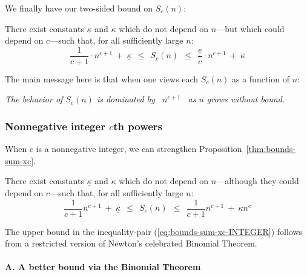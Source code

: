 \smallskip

We finally have our two-sided bound on $S_c(n)$:

\begin{prop}
\label{thm:bounds-sum-xc}
There exist constants $\underline{\kappa}$ and $\kappa$ which do not depend on $n$---but which could depend on $c$---such that, for all sufficiently large $n$:
\begin{equation}
\label{eq:bounds-sum-xc}
\frac{1}{c+1} \cdot n^{c+1} \ + \ \underline{\kappa}
  \ \ \leq \ \ S_c(n)
  \ \ \leq \ \ \frac{e}{c} \cdot n^{c+1} \ + \ \kappa
\end{equation}
\end{prop}

\medskip

\noindent
The main message here is that when one views each $S_c(n)$ as a function of $n$:

\smallskip

\begin{center}
{\em The behavior of $S_c(n)$ is dominated by \ $n^{c+1}$ \ as $n$ grows without bound.}
\end{center}

\subsubsection{Nonnegative integer $c$th powers}
\label{sec:positive-integer-power}

When $c$ is a nonnegative integer, we can strengthen Proposition~\ref{thm:bounds-sum-xc}.

\begin{prop}
\label{thm:bounds-sum-xc-INTEGER}
There exist constants $\underline{\kappa}$ and $\kappa$ which do not depend on $n$---although they could depend on $c$---such that, for all sufficiently large $n$:
\begin{equation}
\label{eq:bounds-sum-xc-INTEGER}
\frac{1}{c+1} n^{c+1} \ + \ \underline{\kappa}
  \ \ \leq \ \ S_c(n)
  \ \ \leq \ \ \frac{1}{c+1} n^{c+1} \ + \ \kappa n^c
\end{equation}
\end{prop}

The upper bound in the inequality-pair (\ref{eq:bounds-sum-xc-INTEGER}) follows from a restricted version of Newton's celebrated Binomial Theorem.


\paragraph{A. A better bound via the Binomial Theorem}

